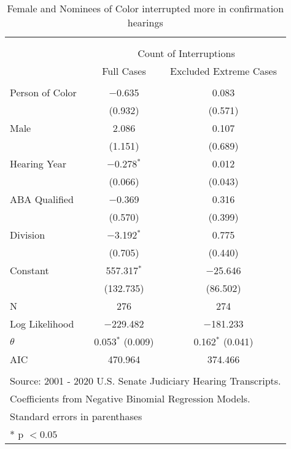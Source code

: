 
\begin{table}[!htbp] \centering 
  \caption{Female and Nominees of Color interrupted more in confirmation hearings} 
  \label{} 
\begin{tabular}{@{\extracolsep{5pt}}lcc} 
\\[-1.8ex]\hline \\[-1.8ex] 
\\[-1.8ex] & \multicolumn{2}{c}{Count of Interruptions} \\ 
 & Full Cases & Excluded Extreme Cases \\ 
\hline \\[-1.8ex] 
 Person of Color & $-$0.635 & 0.083 \\ 
  & (0.932) & (0.571) \\ 
  Male & 2.086 & 0.107 \\ 
  & (1.151) & (0.689) \\ 
  Hearing Year & $-$0.278$^{*}$ & 0.012 \\ 
  & (0.066) & (0.043) \\ 
  ABA Qualified & $-$0.369 & 0.316 \\ 
  & (0.570) & (0.399) \\ 
  Division & $-$3.192$^{*}$ & 0.775 \\ 
  & (0.705) & (0.440) \\ 
  Constant & 557.317$^{*}$ & $-$25.646 \\ 
  & (132.735) & (86.502) \\ 
 N & 276 & 274 \\ 
Log Likelihood & $-$229.482 & $-$181.233 \\ 
$\theta$ & 0.053$^{*}$  (0.009) & 0.162$^{*}$  (0.041) \\ 
AIC & 470.964 & 374.466 \\ 
\hline \\[-1.8ex] 
\multicolumn{3}{l}{Source: 2001 - 2020 U.S. Senate Judiciary Hearing Transcripts.} \\ 
\multicolumn{3}{l}{Coefficients from Negative Binomial Regression Models.} \\ 
\multicolumn{3}{l}{Standard errors in parenthases} \\ 
\multicolumn{3}{l}{* p $<0.05$} \\ 
\end{tabular} 
\end{table} 
